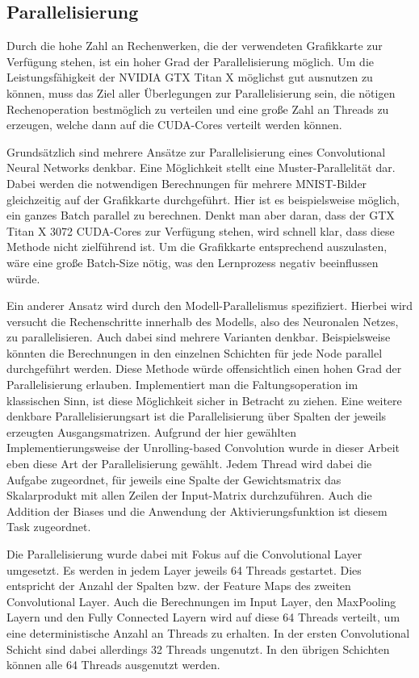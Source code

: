\documentclass[../main.tex]{subfiles}
\begin{document}
\subsection{Parallelisierung} \label{sec:cuda_parallelisierung}
Durch die hohe Zahl an Rechenwerken, die der verwendeten Grafikkarte zur Verfügung stehen, ist ein hoher Grad der Parallelisierung möglich. Um die Leistungsfähigkeit der NVIDIA GTX Titan X möglichst gut ausnutzen zu können, muss das Ziel aller Überlegungen zur Parallelisierung sein, die nötigen Rechenoperation bestmöglich zu verteilen und eine große Zahl an Threads zu erzeugen, welche dann auf die CUDA-Cores verteilt werden können. \par 
Grundsätzlich sind mehrere Ansätze zur Parallelisierung eines Convolutional Neural Networks denkbar. Eine Möglichkeit stellt eine Muster-Parallelität dar. Dabei werden die notwendigen Berechnungen für mehrere MNIST-Bilder gleichzeitig auf der Grafikkarte durchgeführt. Hier ist es beispielsweise möglich, ein ganzes Batch parallel zu berechnen. Denkt man aber daran, dass der GTX Titan X 3072 CUDA-Cores zur Verfügung stehen, wird schnell klar, dass diese Methode nicht zielführend ist. Um die Grafikkarte entsprechend auszulasten, wäre eine große Batch-Size nötig, was den Lernprozess negativ beeinflussen würde. \par 
Ein anderer Ansatz wird durch den Modell-Parallelismus spezifiziert. Hierbei wird versucht die Rechenschritte innerhalb des Modells, also des Neuronalen Netzes, zu parallelisieren. Auch dabei sind mehrere Varianten denkbar. Beispielsweise könnten die Berechnungen in den einzelnen Schichten für jede Node parallel durchgeführt werden. Diese Methode würde offensichtlich einen hohen Grad der Parallelisierung erlauben. Implementiert man die Faltungsoperation im klassischen Sinn, ist diese Möglichkeit sicher in Betracht zu ziehen. Eine weitere denkbare Parallelisierungsart ist die Parallelisierung über Spalten der jeweils erzeugten Ausgangsmatrizen. Aufgrund der hier gewählten Implementierungsweise der Unrolling-based Convolution wurde in dieser Arbeit eben diese Art der Parallelisierung gewählt. Jedem Thread wird dabei die Aufgabe zugeordnet, für jeweils eine Spalte der Gewichtsmatrix das Skalarprodukt mit allen Zeilen der Input-Matrix durchzuführen. Auch die Addition der Biases und die Anwendung der Aktivierungsfunktion ist diesem Task zugeordnet. \par Die Parallelisierung wurde dabei mit Fokus auf die Convolutional Layer umgesetzt. Es werden in jedem Layer jeweils 64 Threads gestartet. Dies entspricht der Anzahl der Spalten bzw. der Feature Maps des zweiten Convolutional Layer. Auch die Berechnungen im Input Layer, den MaxPooling Layern und den Fully Connected Layern wird auf diese 64 Threads verteilt, um eine deterministische Anzahl an Threads zu erhalten. In der ersten Convolutional Schicht sind dabei allerdings 32 Threads ungenutzt. In den übrigen Schichten können alle 64 Threads ausgenutzt werden. \par 
\end{document}
